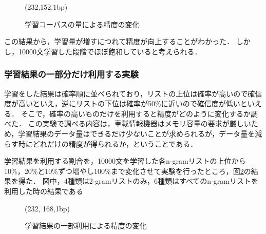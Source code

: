 \begin{figure}
  \begin{center}
    \begin{epsf}
    \end{epsf}
    \begin{draft}
    \atari(232,152,1bp)
    \end{draft}
    \caption{学習コーパスの量による精度の変化}
    
    
    
    \label{fig:学習量}
  \end{center}
\end{figure}

この結果から，学習量が増すにつれて精度が向上することがわかった．
しかし，10000文学習した段階でほぼ飽和していると考えられる．


\subsubsection{学習結果の一部分だけ利用する実験}\label{subsubsec:一部利用}

学習をした結果は確率順に並べられており，リストの上位は確率が高いので確信度が高いといえ，逆にリストの下位は確率が50\%に近いので確信度が低いといえる．
そこで，確率の高いものだけを利用すると精度がどのように変化するか調べた．
この実験で調べる内容は，車載情報機器はメモリ容量の要求が厳しいため，学習結果のデータ量はできるだけ少ないことが求められるが，データ量を減らす時にどれだけの精度が得られるか，ということである．

学習結果を利用する割合を，10000文を学習した各n-gramリストの上位から10\%，20\%と10\%ずつ増やし100\%まで変化させて実験を行ったところ，図\ref{fig:一部利用}の結果を得た．
図中，4種類は2-gramリストのみ，6種類はすべてのn-gramリストを利用した時の結果である

\begin{figure}
  \begin{center}
    \begin{epsf}
    \end{epsf}
    \begin{draft}
    \atari(232, 168,1bp)
    \end{draft}
    \caption{学習結果の一部利用による精度の変化}
    
    
    
    \label{fig:一部利用}
  \end{center}
\end{figure}

